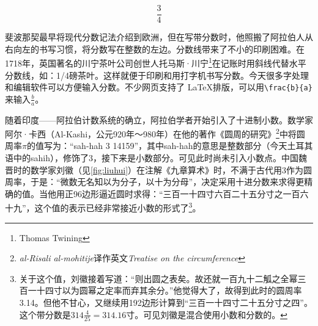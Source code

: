 \documentclass[b5paper]{ctexart}
\begin{document}
\[
\dfrac{3}{4}
\]

斐波那契最早将现代分数记法介绍到欧洲，但在写带分数时，他照搬了阿拉伯人从右向左的书写习惯，将分数写在整数的左边\cite{Miller-2025}。分数线带来了不小的印刷困难。在1718年，英国著名的川宁茶叶公司创世人托马斯·川宁\footnote{Thomas Twining}在记账时用斜线代替水平分数线，如：1/4磅茶叶。这样就便于印刷和用打字机书写分数。今天很多字处理和编辑软件可以方便输入分数。不少网页支持了 \LaTeX 排版，可以用\lstinline|\frac{b}{a}|来输入$\frac{b}{a}$。

随着印度——阿拉伯计数系统的确立，阿拉伯学者开始引入了十进制小数。数学家阿尔·卡西（Al-Kashi，公元920年～980年）在他的著作《圆周的研究》\footnote{{\em al-Risali al-mohitije}译作英文{\em Treatise on the circumference}}中将圆周率$\pi$的值写为：“sah-hah 3 14159”，其中sah-hah的意思是整数部分（今天土耳其语中的sahih），修饰了3，接下来是小数部分。可见此时尚未引入小数点。中国魏晋时的数学家刘徽（见\cref{fig:liuhui}）在注解《九章算术》时，不满于古代用3作为圆周率，于是：“微数无名知以为分子，以十为分母”，决定采用十进分数来求得更精确的值。当他用正96边形逼近圆时求得：“三百一十四寸六百二十五分寸之一百六十九”，这个值的表示已经非常接近小数的形式了\footnote{关于这个值，刘徽接着写道：“则出圆之表矣。故还就一百九十二觚之全幂三百一十四寸以为圆幂之定率而弃其余分。”他觉得大了，故得到此时的圆周率3.14。但他不甘心，又继续用192边形计算到“三百一十四寸二十五分寸之四”。这个带分数是$314\frac{4}{25} = 314.16$寸。可见刘徽是混合使用小数和分数的。}。
\end{document}
